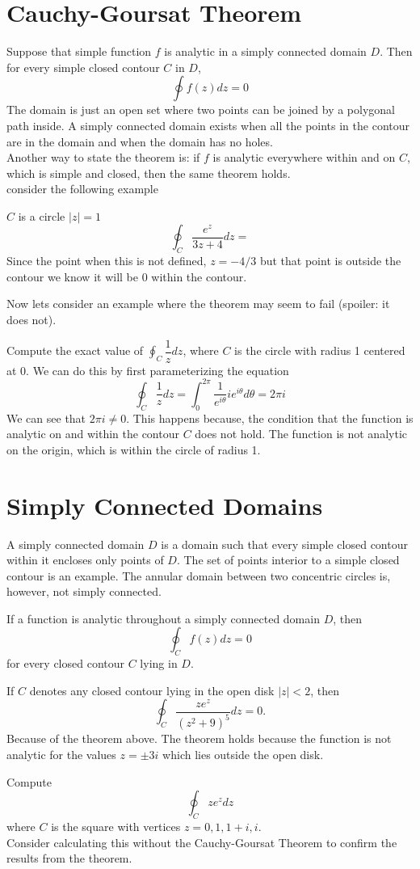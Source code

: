 \section{Cauchy-Goursat Theorem}
Suppose that simple function $ f $ is analytic in a simply connected domain $ D $. Then for every simple closed contour $ C $ in $ D $, \[ \oint f(z) dz = 0 \] 
The domain is just an open set where two points can be joined by a polygonal path inside. A simply connected domain exists when all the points in the contour are in the domain and when the domain has no holes.  \\ Another way to state the theorem is: if $ f $ is analytic everywhere within and on $ C $, which is simple and closed, then the same theorem holds. \\ consider the following example 
\begin{example}
	$ C $ is a circle $ |z| = 1 $ \[ \oint_C \dfrac{e^z}{3z + 4} dz = \] 
	Since the point when this is not defined, $ z = -4/3 $ but that point is outside the contour we know it will be $ 0 $ within the contour. 
\end{example}
Now lets consider an example where the theorem may seem to fail (spoiler: it does not). 
\begin{example}
	Compute the exact value of $ \oint _C \dfrac{1}{z} dz$, where $ C $ is the circle with radius 1 centered at 0. We can do this by first parameterizing the equation 
	\[ \oint_C \dfrac{1}{z} dz = \int_{0}^{2 \pi} \dfrac{1}{e^{i \theta}} ie^{i \theta} d\theta = 2\pi i \] 
	We can see that $  2 \pi i \neq 0 $. This happens because, the condition that the function is analytic on and within the contour $ C $ does not hold. The function is not analytic on the origin, which is within the circle of radius 1.
\end{example}
\section{Simply Connected Domains}
A simply connected domain $ D $ is a domain such that every simple closed contour
within it encloses only points of $ D $. The set of points interior to a simple closed
contour is an example. The annular domain between two concentric circles is, however, not simply connected.
\begin{theorem}
	If a function is analytic throughout a simply connected domain $ D $, then \[ \oint_C f(z) dz = 0 \] for every closed contour $ C $ lying in $ D $. 
\end{theorem}
\begin{example}
	If $ C $ denotes any closed contour lying in the open disk $ |z| < 2 $, then \[ \oint _C \dfrac{z e^z}{(z^2 + 9)^5} dz = 0.\] Because of the theorem above. The theorem holds because the function is not analytic for the values $ z = \pm 3i $ which lies outside the open disk. 
\end{example}
\begin{example}
	Compute \[ \oint_C ze^z dz \] where $ C $ is the square with vertices $ z = 0,1, 1+ i, i $. \\ \indent Consider calculating this without the Cauchy-Goursat Theorem to confirm the results from the theorem. 
\end{example}

